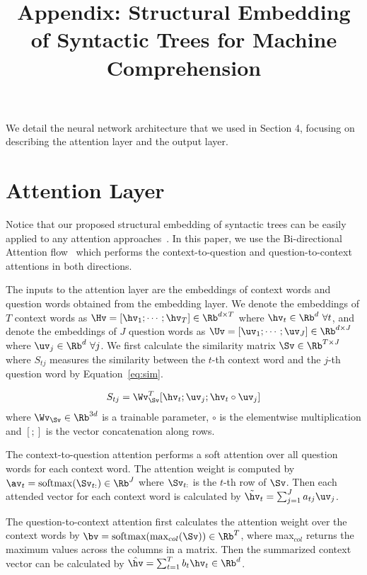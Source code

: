 \documentclass[11pt,letterpaper]{article}
\title{ Appendix: Structural Embedding of Syntactic Trees for Machine Comprehension }
\date{}
\begin{document}
\maketitle

We detail the neural network architecture that we used in Section 4, focusing on describing the attention layer and the output layer.

\section{Attention Layer}
Notice that our proposed structural embedding of syntactic trees can be easily applied to any attention approaches~\cite{xiong2016dynamic,seo2016bidirectional,wang2016multi,wang2016machine}. In this paper, we use the Bi-directional Attention flow~\cite{seo2016bidirectional} which performs the context-to-question and question-to-context attentions in both directions.

The inputs to the attention layer are the embeddings of context words and question words obtained from the embedding layer.  We denote the embeddings of $T$ context words as $\Hv=[\hv_1; \cdots; \hv_T]\in\Rb^{d\times T}$ where $\hv_t\in\Rb^d~\forall t$, and denote the embeddings of $J$ question words as $\Uv=[\uv_1; \cdots; \uv_J]\in\Rb^{d\times J}$ where $\uv_j\in\Rb^d~\forall j$. We first calculate the similarity matrix $\Sv\in\Rb^{T\times J}$ where $S_{tj}$ measures the similarity between the $t$-th context word and the $j$-th question word by Equation~\ref{eq:sim}. 

\begin{align}\label{eq:sim}
    S_{tj} = \Wv_{\Sv}^T[\hv_t; \uv_j; \hv_t \circ \uv_j]
\end{align}
where $\Wv_{\Sv}\in\Rb^{3d}$ is a trainable parameter, $\circ$ is the elementwise multiplication and $[;]$ is the vector concatenation along rows.

The context-to-question attention performs a soft attention over all question words for each context word. The attention weight is computed by $\av_t=\textnormal{softmax}(\Sv_{t:})\in\Rb^J$ where $\Sv_{t:}$ is the $t$-th row of $\Sv$. Then each attended vector for each context word is calculated by $\tilde{\hv}_t=\sum_{j=1}^J a_{tj} \uv_j$.

The question-to-context attention first calculates the attention weight over the context words by $\bv = \textnormal{softmax}(\textnormal{max}_{col}(\Sv)) \in \Rb^T$, where max$_{col}$ returns the maximum values across the columns in a matrix. Then the summarized context vector can be calculated by $\hat{\hv}=\sum_{t=1}^T b_t \hv_t\in \Rb^{d}$.  
\end{document}
